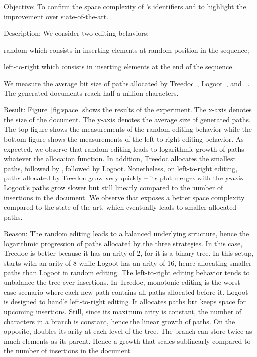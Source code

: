 \begin{asparadesc}
\item [Objective:] To confirm the space complexity of \LSEQ's identifiers and to
  highlight the improvement over state-of-the-art.
\item [Description:] We consider two editing behaviors:
  \begin{inparaenum}[(i)]
  \item random which consists in inserting elements at random position in the sequence;
  \item left-to-right which consists in inserting elements at the end of the
    sequence.
  \end{inparaenum} We measure the average bit size of paths allocated by
  Treedoc~\cite{preguica2009commutative}, Logoot~\cite{weiss2009logoot}, and
  \LSEQ~\cite{nedelec2013lseq}. The generated documents reach half a million
  characters.
\item [Result:] Figure~\ref{fig:space} shows the results of the experiment. The
  x-axis denotes the size of the document. The y-axis denotes the average size
  of generated paths. The top figure shows the measurements of the random
  editing behavior while the bottom figure shows the measurements of the
  left-to-right editing behavior. As expected, we observe that random editing
  leads to logarithmic growth of paths whatever the allocation function. In
  addition, Treedoc allocates the smallest paths, followed by \LSEQ, followed by
  Logoot. Nonetheless, on left-to-right editing, paths allocated by Treedoc grow
  very quickly -- its plot merges with the y-axis. Logoot's paths grow slower
  but still linearly compared to the number of insertions in the document. We
  observe that \LSEQ exposes a better space complexity compared to the
  state-of-the-art, which eventually leads to smaller allocated paths.
\item [Reason:] The random editing leads to a balanced underlying structure,
  hence the logarithmic progression of paths allocated by the three
  strategies. In this case, Treedoc is better because it has an arity of 2, for
  it is a binary tree. In this setup, \LSEQ starts with an arity of 8 while
  Logoot has an arity of 16, hence \LSEQ allocating smaller paths than Logoot in
  random editing. The left-to-right editing behavior tends to unbalance the tree
  over insertions. In Treedoc, monotonic editing is the worst case scenario
  where each new path contains all paths allocated before it. Logoot is designed
  to handle left-to-right editing. It allocates paths but keeps space for
  upcoming insertions. Still, since its maximum arity is constant, the number of
  characters in a branch is constant, hence the linear growth of paths. On the
  opposite, \LSEQ doubles its arity at each level of the tree. The branch can
  store twice as much elements as its parent. Hence a growth that scales
  sublinearly compared to the number of insertions in the document.
\end{asparadesc}

